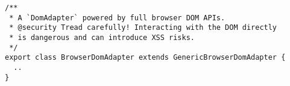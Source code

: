 \begin{verbatim}
/**
 * A `DomAdapter` powered by full browser DOM APIs.
 * @security Tread carefully! Interacting with the DOM directly
 * is dangerous and can introduce XSS risks.
 */
export class BrowserDomAdapter extends GenericBrowserDomAdapter {
  ..
}
\end{verbatim}

